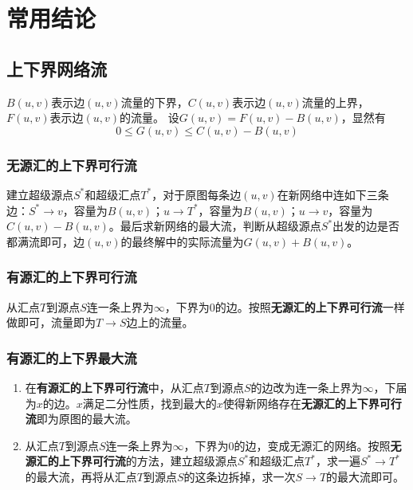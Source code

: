 \documentclass[a4paper]{ctexart}
\begin{document}
\section{常用结论}

\subsection{上下界网络流}
$B(u,v)$表示边$(u,v)$流量的下界，$C(u,v)$表示边$(u,v)$流量的上界，$F(u,v)$表示边$(u,v)$的流量。
设$G(u,v) = F(u,v) - B(u,v)$，显然有
$$0 \leq G(u,v) \leq C(u,v)-B(u,v)$$

\subsubsection*{无源汇的上下界可行流}
建立超级源点$S^*$和超级汇点$T^*$，对于原图每条边$(u,v)$在新网络中连如下三条边：$S^* \rightarrow v$，容量为$B(u,v)$；$u \rightarrow T^*$，容量为$B(u,v)$；$u \rightarrow v$，容量为$C(u,v) - B(u,v)$。最后求新网络的最大流，判断从超级源点$S^*$出发的边是否都满流即可，边$(u,v)$的最终解中的实际流量为$G(u,v)+B(u,v)$。

\subsubsection*{有源汇的上下界可行流}
从汇点$T$到源点$S$连一条上界为$\infty$，下界为$0$的边。按照\textbf{无源汇的上下界可行流}一样做即可，流量即为$T \rightarrow S$边上的流量。

\subsubsection*{有源汇的上下界最大流}
\begin{enumerate}
	\item 在\textbf{有源汇的上下界可行流}中，从汇点$T$到源点$S$的边改为连一条上界为$\infty$，下届为$x$的边。$x$满足二分性质，找到最大的$x$使得新网络存在\textbf{无源汇的上下界可行流}即为原图的最大流。
	\item 从汇点$T$到源点$S$连一条上界为$\infty$，下界为$0$的边，变成无源汇的网络。按照\textbf{无源汇的上下界可行流}的方法，建立超级源点$S^*$和超级汇点$T^*$，求一遍$S^* \rightarrow T^*$的最大流，再将从汇点$T$到源点$S$的这条边拆掉，求一次$S \rightarrow T$的最大流即可。
\end{enumerate}
\end{document}
